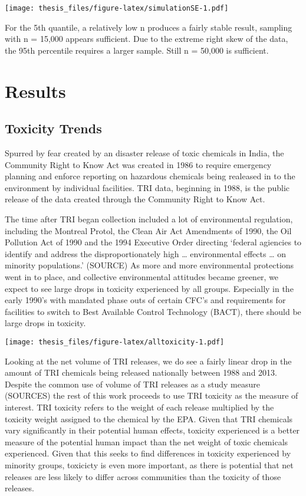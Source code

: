 \documentclass[12pt,twoside]{dukestatscithesis}
\theoremstyle{definition}
\theoremstyle{definition}
\theoremstyle{definition}
\theoremstyle{remark}
\begin{document}
\texttt{[image: thesis\_files/figure-latex/simulationSE-1.pdf]}

For the 5th quantile, a relatively low n produces a fairly stable
result, sampling with n = 15,000 appears sufficient. Due to the extreme
right skew of the data, the 95th percentile requires a larger sample.
Still n = 50,000 is sufficient.

\chapter{Results}\label{organization}

\section{Toxicity Trends}\label{toxicity-trends}

Spurred by fear created by an disaster release of toxic chemicals in
India, the Community Right to Know Act was created in 1986 to require
emergency planning and enforce reporting on hazardous chemicals being
realeased in to the environment by individual facilities. TRI data,
beginning in 1988, is the public release of the data created through the
Community Right to Know Act.

The time after TRI began collection included a lot of environmental
regulation, including the Montreal Protol, the Clean Air Act Amendments
of 1990, the Oil Pollution Act of 1990 and the 1994 Executive Order
directing `federal agiencies to identify and address the
disproportionately high \ldots{} environmental effects \ldots{} on
minority populations.' (SOURCE) As more and more environmental
protections went in to place, and collective environmental attitudes
became greener, we expect to see large drops in toxicity experienced by
all groups. Especially in the early 1990's with mandated phase outs of
certain CFC's and requirements for facilities to switch to Best
Available Control Technology (BACT), there should be large drops in
toxicity.

\texttt{[image: thesis\_files/figure-latex/alltoxicity-1.pdf]}

Looking at the net volume of TRI releases, we do see a fairly linear
drop in the amount of TRI chemicals being released nationally between
1988 and 2013. Despite the common use of volume of TRI releases as a
study measure (SOURCES) the rest of this work proceeds to use TRI
toxicity as the measure of interest. TRI toxicity refers to the weight
of each release multiplied by the toxicity weight assigned to the
chemical by the EPA. Given that TRI chemicals vary significantly in
their potential human effects, toxicity experienced is a better measure
of the potential human impact than the net weight of toxic chemicals
experienced. Given that this seeks to find differences in toxicity
experienced by minority groups, toxicicty is even more important, as
there is potential that net releases are less likely to differ across
communities than the toxicity of those releases.
\end{document}
